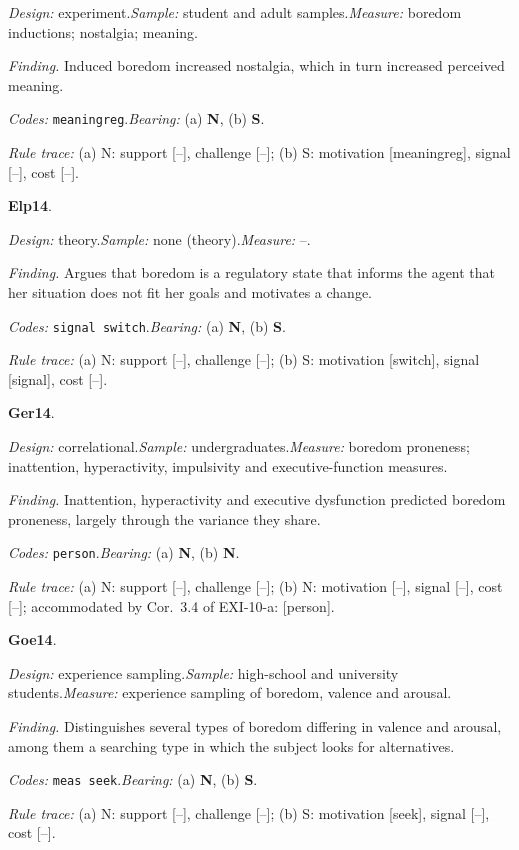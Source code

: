 {\small\noindent\textit{Design:} experiment.\quad \textit{Sample:} student and adult samples.\quad \textit{Measure:} boredom inductions; nostalgia; meaning.\par
\noindent\textit{Finding.} Induced boredom increased nostalgia, which in turn increased perceived meaning.\par
\noindent\textit{Codes:} \texttt{meaningreg}.\quad \textit{Bearing:} (a) \textbf{N}, (b) \textbf{S}.\par
\noindent\textit{Rule trace:} (a) N: support {[}--{]}, challenge {[}--{]}; (b) S: motivation {[}meaningreg{]}, signal {[}--{]}, cost {[}--{]}.\par}
\medskip
{}
\noindent\textbf{Elp14}\enspace \citet{Elpidorou2014}.\par
{\small\noindent\textit{Design:} theory.\quad \textit{Sample:} none (theory).\quad \textit{Measure:} --.\par
\noindent\textit{Finding.} Argues that boredom is a regulatory state that informs the agent that her situation does not fit her goals and motivates a change.\par
\noindent\textit{Codes:} \texttt{signal switch}.\quad \textit{Bearing:} (a) \textbf{N}, (b) \textbf{S}.\par
\noindent\textit{Rule trace:} (a) N: support {[}--{]}, challenge {[}--{]}; (b) S: motivation {[}switch{]}, signal {[}signal{]}, cost {[}--{]}.\par}
\medskip
{}
\noindent\textbf{Ger14}\enspace \citet{Gerritsen2014}.\par
{\small\noindent\textit{Design:} correlational.\quad \textit{Sample:} undergraduates.\quad \textit{Measure:} boredom proneness; inattention, hyperactivity, impulsivity and executive-function measures.\par
\noindent\textit{Finding.} Inattention, hyperactivity and executive dysfunction predicted boredom proneness, largely through the variance they share.\par
\noindent\textit{Codes:} \texttt{person}.\quad \textit{Bearing:} (a) \textbf{N}, (b) \textbf{N}.\par
\noindent\textit{Rule trace:} (a) N: support {[}--{]}, challenge {[}--{]}; (b) N: motivation {[}--{]}, signal {[}--{]}, cost {[}--{]}; accommodated by Cor.~3.4 of EXI-10-a: {[}person{]}.\par}
\medskip
{}
\noindent\textbf{Goe14}\enspace \citet{Goetz2014}.\par
{\small\noindent\textit{Design:} experience sampling.\quad \textit{Sample:} high-school and university students.\quad \textit{Measure:} experience sampling of boredom, valence and arousal.\par
\noindent\textit{Finding.} Distinguishes several types of boredom differing in valence and arousal, among them a searching type in which the subject looks for alternatives.\par
\noindent\textit{Codes:} \texttt{meas seek}.\quad \textit{Bearing:} (a) \textbf{N}, (b) \textbf{S}.\par
\noindent\textit{Rule trace:} (a) N: support {[}--{]}, challenge {[}--{]}; (b) S: motivation {[}seek{]}, signal {[}--{]}, cost {[}--{]}.\par}
